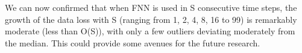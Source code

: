 We can now confirmed that when FNN is used in S consecutive time steps, the growth of the data loss with S (ranging from 1, 2, 4, 8, 16 to 99) is remarkably moderate (less than O(S)), with only a few outliers deviating moderately from the median. This could provide some avenues for the future research.




